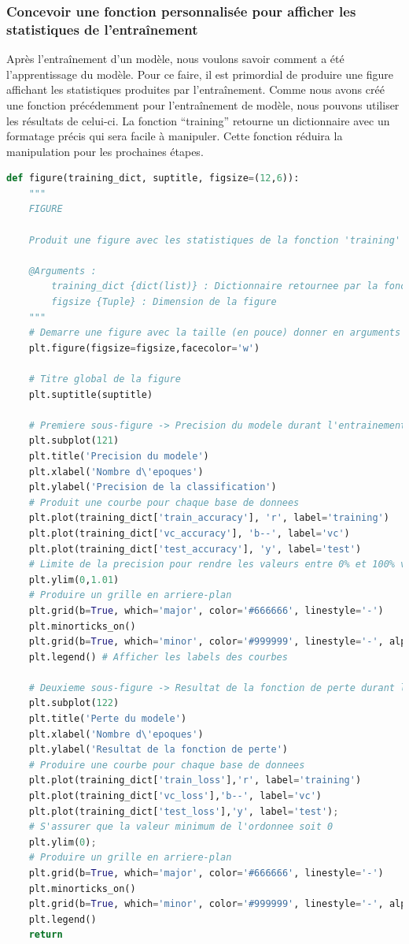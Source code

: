 \documentclass{article}
\begin{document}
\subsubsection{Concevoir une fonction personnalisée pour afficher les statistiques de l'entraînement}
Après l'entraînement d'un modèle, nous voulons savoir comment a été l'apprentissage du modèle. Pour ce faire, il est primordial de produire une figure affichant les statistiques produites par l'entraînement. Comme nous avons créé une fonction précédemment pour l'entraînement de modèle, nous pouvons utiliser les résultats de celui-ci. La fonction ``training'' retourne un dictionnaire avec un formatage précis qui sera facile à manipuler. Cette fonction réduira la manipulation pour les prochaines étapes.
\medbreak
\begin{lstlisting}[language=Python, caption={Fonction pour l'affichage des statistiques de l'entraînement}, label={code:figure}]
def figure(training_dict, suptitle, figsize=(12,6)):
    """
    FIGURE

    Produit une figure avec les statistiques de la fonction 'training'

    @Arguments :
        training_dict {dict(list)} : Dictionnaire retournee par la fonction training
        figsize {Tuple} : Dimension de la figure
    """
    # Demarre une figure avec la taille (en pouce) donner en arguments
    plt.figure(figsize=figsize,facecolor='w')

    # Titre global de la figure
    plt.suptitle(suptitle)

    # Premiere sous-figure -> Precision du modele durant l'entrainement
    plt.subplot(121)
    plt.title('Precision du modele')
    plt.xlabel('Nombre d\'epoques')
    plt.ylabel('Precision de la classification')
    # Produit une courbe pour chaque base de donnees
    plt.plot(training_dict['train_accuracy'], 'r', label='training')
    plt.plot(training_dict['vc_accuracy'], 'b--', label='vc')
    plt.plot(training_dict['test_accuracy'], 'y', label='test')
    # Limite de la precision pour rendre les valeurs entre 0% et 100% visibles
    plt.ylim(0,1.01)
    # Produire un grille en arriere-plan
    plt.grid(b=True, which='major', color='#666666', linestyle='-')
    plt.minorticks_on()
    plt.grid(b=True, which='minor', color='#999999', linestyle='-', alpha=0.2)
    plt.legend() # Afficher les labels des courbes

    # Deuxieme sous-figure -> Resultat de la fonction de perte durant l'entrainement
    plt.subplot(122)
    plt.title('Perte du modele')
    plt.xlabel('Nombre d\'epoques')
    plt.ylabel('Resultat de la fonction de perte')
    # Produire une courbe pour chaque base de donnees
    plt.plot(training_dict['train_loss'],'r', label='training')
    plt.plot(training_dict['vc_loss'],'b--', label='vc')
    plt.plot(training_dict['test_loss'],'y', label='test');
    # S'assurer que la valeur minimum de l'ordonnee soit 0
    plt.ylim(0);
    # Produire un grille en arriere-plan
    plt.grid(b=True, which='major', color='#666666', linestyle='-')
    plt.minorticks_on()
    plt.grid(b=True, which='minor', color='#999999', linestyle='-', alpha=0.2)
    plt.legend()
    return
\end{lstlisting}
\end{document}
